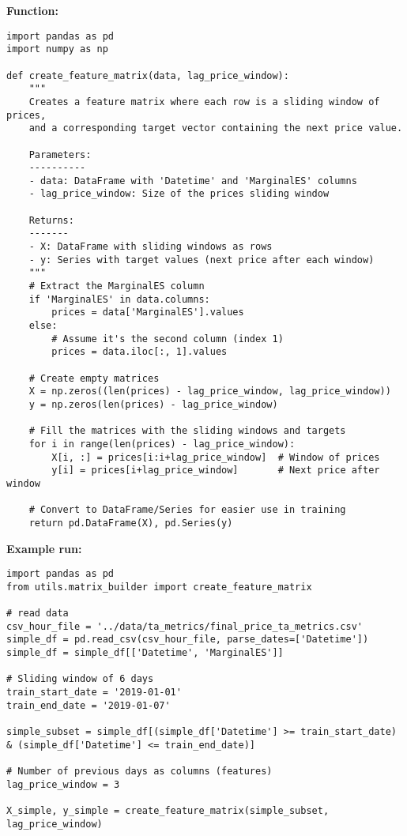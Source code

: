 \documentclass[12pt]{report} %
\begin{document}
\noindent \textbf{Function:}
\begin{lstlisting}
import pandas as pd
import numpy as np

def create_feature_matrix(data, lag_price_window):
    """
    Creates a feature matrix where each row is a sliding window of prices,
    and a corresponding target vector containing the next price value.
    
    Parameters:
    ----------
    - data: DataFrame with 'Datetime' and 'MarginalES' columns
    - lag_price_window: Size of the prices sliding window
    
    Returns:
    -------
    - X: DataFrame with sliding windows as rows
    - y: Series with target values (next price after each window)
    """
    # Extract the MarginalES column
    if 'MarginalES' in data.columns:
        prices = data['MarginalES'].values
    else:
        # Assume it's the second column (index 1)
        prices = data.iloc[:, 1].values
    
    # Create empty matrices
    X = np.zeros((len(prices) - lag_price_window, lag_price_window))
    y = np.zeros(len(prices) - lag_price_window)
    
    # Fill the matrices with the sliding windows and targets
    for i in range(len(prices) - lag_price_window):
        X[i, :] = prices[i:i+lag_price_window]  # Window of prices
        y[i] = prices[i+lag_price_window]       # Next price after window
    
    # Convert to DataFrame/Series for easier use in training
    return pd.DataFrame(X), pd.Series(y)
\end{lstlisting}

\noindent \textbf{Example run:}
\begin{lstlisting}
import pandas as pd
from utils.matrix_builder import create_feature_matrix

# read data
csv_hour_file = '../data/ta_metrics/final_price_ta_metrics.csv'
simple_df = pd.read_csv(csv_hour_file, parse_dates=['Datetime'])
simple_df = simple_df[['Datetime', 'MarginalES']]

# Sliding window of 6 days
train_start_date = '2019-01-01'
train_end_date = '2019-01-07'

simple_subset = simple_df[(simple_df['Datetime'] >= train_start_date) & (simple_df['Datetime'] <= train_end_date)]

# Number of previous days as columns (features)
lag_price_window = 3

X_simple, y_simple = create_feature_matrix(simple_subset, lag_price_window)
\end{lstlisting}
\end{document}
